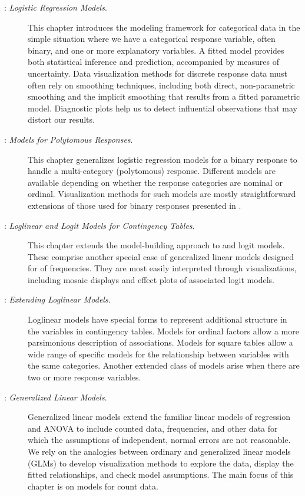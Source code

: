 \begin{description}
\item[: \emph{Logistic Regression Models}.]
This chapter introduces the modeling framework for categorical data in the simple
situation where we have a categorical response variable, often binary, and one or
more explanatory variables. A fitted model provides both statistical
inference and prediction, accompanied by measures of uncertainty.
Data visualization methods for discrete response data must often rely
on smoothing techniques, including both direct, non-parametric smoothing
and the implicit smoothing that results from a fitted parametric model.
Diagnostic plots help us to detect influential observations that may distort
our results.

\item[: \emph{Models for Polytomous Responses}.]
This chapter generalizes logistic regression models for a binary response to
handle a multi-category (polytomous) response.  Different models are available depending on
whether the response categories are nominal or ordinal.
Visualization methods for such models are mostly straightforward extensions
of those used for binary responses presented in .

\item[: \emph{Loglinear and Logit Models for Contingency Tables}.]
This chapter extends the model-building approach to \loglin and logit
models. These comprise another special case of generalized linear models
designed for \ctabs of frequencies.  They
are most easily interpreted through
visualizations, including mosaic displays and effect plots of associated
logit models.  

\item[: \emph{Extending Loglinear Models}.]
Loglinear models have special forms to represent additional structure in the
variables in contingency tables.  Models for ordinal factors allow a more
parsimonious description of associations.  Models for square tables
allow a wide range of specific models for the relationship between
variables with the same categories.  Another extended class of
models arise when there are two or more response variables.


\item[: \emph{Generalized Linear Models}.]
Generalized linear models extend the familiar linear models of
regression and ANOVA to
include counted data, frequencies, and other data for which the
assumptions of independent, normal errors are not reasonable.
We rely on the analogies between ordinary and generalized linear
models (GLMs) to develop visualization methods to explore the data,
display the fitted relationships, and check model assumptions.
The main focus of this chapter is on models for count data.

\end{description}






